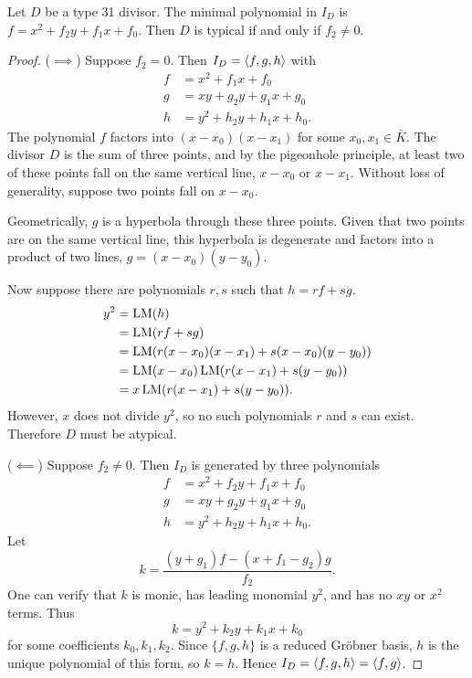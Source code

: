 \begin{theorem}
  \label{thm_typical_type_31_divisors}
  Let $D$ be a type 31 divisor.
  The minimal polynomial in $I_D$ is $f = x^2 + f_2y + f_1x + f_0$.
  Then $D$ is typical if and only if $f_2 \neq 0$.
\end{theorem}
\begin{proof}
  ($\implies$)
  Suppose $f_2 = 0$.
  Then $I_D = \left\langle f, g, h \right\rangle$ with
  \begin{align*}
    f &= x^2 + f_1x + f_0 \\
    g &= xy  + g_2y + g_1x + g_0 \\
    h &= y^2 + h_2y + h_1x + h_0.
  \end{align*}
  The polynomial $f$ factors into $(x - x_0)(x - x_1)$ for some $x_0, x_1 \in \bar K$.
  The divisor $D$ is the sum of three points, and by the pigeonhole principle,
  at least two of these points fall on the same vertical line, $x - x_0$ or $x - x_1$.
  Without loss of generality, suppose two points fall on $x - x_0$.
  
  Geometrically, $g$ is a hyperbola through these three points.
  Given that two points are on the same vertical line,
  this hyperbola is degenerate and factors into a product of two lines, $g = (x - x_0)(y - y_0)$.
  
  Now suppose there are polynomials $r, s$ such that $h = rf + sg$.
  \begin{align*}
    y^2 &= \operatorname{LM}(h) \\
        &= \operatorname{LM}(rf + sg) \\
        &= \operatorname{LM}(r(x - x_0)(x - x_1) + s(x - x_0)(y - y_0)) \\
        &= \operatorname{LM}(x - x_0)\operatorname{LM}(r(x - x_1) + s(y - y_0)) \\
        &= x\operatorname{LM}(r(x - x_1) + s(y - y_0)).
  \end{align*}
  However, $x$ does not divide $y^2$, so no such polynomials $r$ and $s$ can exist.
  Therefore $D$ must be atypical.
  
  ($\impliedby$)
  Suppose $f_2 \neq 0$.
  Then $I_D$ is generated by three polynomials
  \begin{align*}
    f &= x^2 + f_2y + f_1x + f_0 \\
    g &= xy  + g_2y + g_1x + g_0 \\
    h &= y^2 + h_2y + h_1x + h_0.
  \end{align*}
  Let
  \[ k = \frac {(y + g_1)f - (x + f_1 - g_2)g} {f_2}. \]
  One can verify that $k$ is monic, has leading monomial $y^2$,
  and has no $xy$ or $x^2$ terms. Thus
  \[ k = y^2 + k_2y + k_1x + k_0 \]
  for some coefficients $k_0, k_1, k_2$.
  Since $\{f,g,h\}$ is a reduced Gr\"obner basis, $h$ is the unique polynomial of this form, so $k = h$.
  Hence $I_D = \left\langle f,g,h \right\rangle = \left\langle f,g \right\rangle$.
\end{proof}

